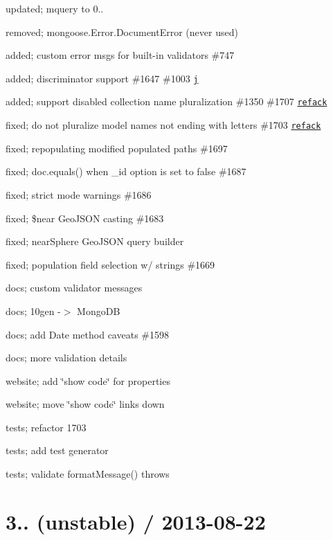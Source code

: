 \begin{DoxyItemize}
\item updated; mquery to 0..
\item removed; mongoose.\+Error.\+Document\+Error (never used)
\item added; custom error msgs for built-\/in validators \#747
\item added; discriminator support \#1647 \#1003 \href{https://github.com/j}{\tt j}
\item added; support disabled collection name pluralization \#1350 \#1707 \href{https://github.com/refack}{\tt refack}
\item fixed; do not pluralize model names not ending with letters \#1703 \href{https://github.com/refack}{\tt refack}
\item fixed; repopulating modified populated paths \#1697
\item fixed; doc.\+equals() when \+\_\+id option is set to false \#1687
\item fixed; strict mode warnings \#1686
\item fixed; \$near Geo\+J\+S\+ON casting \#1683
\item fixed; near\+Sphere Geo\+J\+S\+ON query builder
\item fixed; population field selection w/ strings \#1669
\item docs; custom validator messages
\item docs; 10gen -\/$>$ Mongo\+DB
\item docs; add Date method caveats \#1598
\item docs; more validation details
\item website; add \char`\"{}show code\char`\"{} for properties
\item website; move \char`\"{}show code\char`\"{} links down
\item tests; refactor 1703
\item tests; add test generator
\item tests; validate format\+Message() throws
\end{DoxyItemize}

\section*{3.. (unstable) / 2013-\/08-\/22 }


